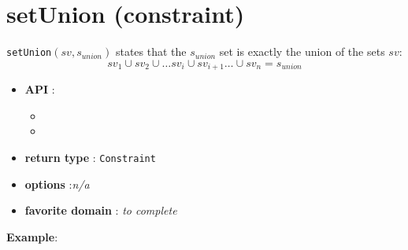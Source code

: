\label{setunion}
\hypertarget{setunion}{}

\section{setUnion (constraint)}\label{setunion:setunionconstraint}\hypertarget{setunion:setunionconstraint}{}
\begin{notedef}
  \texttt{setUnion}$(sv,s_{union})$ states that the $s_{union}$ set is exactly the union of the sets $sv$:
$$sv_1\cup sv_2 \cup \ldots sv_i \cup sv_{i+1} \ldots \cup sv_n=s_{union}$$
\end{notedef}

\begin{itemize}
	\item \textbf{API} : 
	\begin{itemize}
		\item {}
		\item {}
	\end{itemize}
	\item \textbf{return type} : \texttt{Constraint}
	\item \textbf{options} :\emph{n/a}
	\item \textbf{favorite domain} : \emph{to complete}
\end{itemize}

\textbf{Example}:
